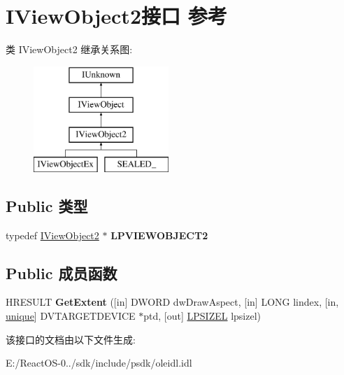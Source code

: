 \hypertarget{interface_i_view_object2}{}\section{I\+View\+Object2接口 参考}
\label{interface_i_view_object2}
类 I\+View\+Object2 继承关系图\+:\begin{figure}[H]
\begin{center}
\leavevmode
\includegraphics[height=4.000000cm]{interface_i_view_object2}
\end{center}
\end{figure}
\subsection*{Public 类型}
\begin{DoxyCompactItemize}
\item 
\mbox{\label{interface_i_view_object2_abe50bdf746bc3cd87aa6e2cde1df0397}} 
typedef \hyperlink{interface_i_view_object2}{I\+View\+Object2} $\ast$ {\bfseries L\+P\+V\+I\+E\+W\+O\+B\+J\+E\+C\+T2}
\end{DoxyCompactItemize}
\subsection*{Public 成员函数}
\begin{DoxyCompactItemize}
\item 
\mbox{\label{interface_i_view_object2_aa50ebfd0efc3d6c98fb3a12a96d8cb70}} 
H\+R\+E\+S\+U\+LT {\bfseries Get\+Extent} (\mbox{[}in\mbox{]} D\+W\+O\+RD dw\+Draw\+Aspect, \mbox{[}in\mbox{]} L\+O\+NG lindex, \mbox{[}in, \hyperlink{interfaceunique}{unique}\mbox{]} D\+V\+T\+A\+R\+G\+E\+T\+D\+E\+V\+I\+CE $\ast$ptd, \mbox{[}out\mbox{]} \hyperlink{structtag_s_i_z_e}{L\+P\+S\+I\+Z\+EL} lpsizel)
\end{DoxyCompactItemize}


该接口的文档由以下文件生成\+:\begin{DoxyCompactItemize}
\item 
E\+:/\+React\+O\+S-\/0../sdk/include/psdk/oleidl.\+idl\end{DoxyCompactItemize}
